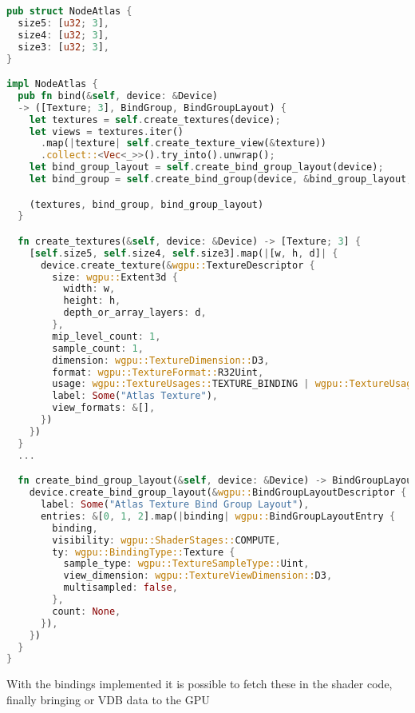 \begin{lstlisting}[language=rust, captionpos=b, caption={
    \texttt{NodeAtlas} definition: The three fields in are the sizes of each atlas.
    The \texttt{create\_textures} creates 3 textures, sets the correct dimensions and sets value type to \texttt{R32Uint} represent a 4 byte single channel which can be used depending on what the value represents.
    The \texttt{create\_bind\_group\_layout} preparse the binding for compute shaders, setting the sample type to \texttt{Uint} to give eas of acess to the atlases; data.
},label={atlas2idx}]
pub struct NodeAtlas {
  size5: [u32; 3],
  size4: [u32; 3],
  size3: [u32; 3],
}

impl NodeAtlas {
  pub fn bind(&self, device: &Device)
  -> ([Texture; 3], BindGroup, BindGroupLayout) {
    let textures = self.create_textures(device);
    let views = textures.iter()
      .map(|texture| self.create_texture_view(&texture))
      .collect::<Vec<_>>().try_into().unwrap();
    let bind_group_layout = self.create_bind_group_layout(device);
    let bind_group = self.create_bind_group(device, &bind_group_layout, &views);

    (textures, bind_group, bind_group_layout)
  }

  fn create_textures(&self, device: &Device) -> [Texture; 3] {
    [self.size5, self.size4, self.size3].map(|[w, h, d]| {
      device.create_texture(&wgpu::TextureDescriptor {
        size: wgpu::Extent3d {
          width: w,
          height: h,
          depth_or_array_layers: d,
        },
        mip_level_count: 1,
        sample_count: 1,
        dimension: wgpu::TextureDimension::D3,
        format: wgpu::TextureFormat::R32Uint,
        usage: wgpu::TextureUsages::TEXTURE_BINDING | wgpu::TextureUsages::COPY_DST,
        label: Some("Atlas Texture"),
        view_formats: &[],
      })
    })
  }
  ...

  fn create_bind_group_layout(&self, device: &Device) -> BindGroupLayout {
    device.create_bind_group_layout(&wgpu::BindGroupLayoutDescriptor {
      label: Some("Atlas Texture Bind Group Layout"),
      entries: &[0, 1, 2].map(|binding| wgpu::BindGroupLayoutEntry {
        binding,
        visibility: wgpu::ShaderStages::COMPUTE,
        ty: wgpu::BindingType::Texture {
          sample_type: wgpu::TextureSampleType::Uint,
          view_dimension: wgpu::TextureViewDimension::D3,
          multisampled: false,
        },
        count: None,
      }),
    })
  }
}
\end{lstlisting}
        With the bindings implemented it is possible to fetch these in the shader code, finally bringing or VDB data to the GPU

